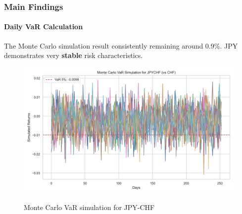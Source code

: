 \documentclass[10pt]{beamer}
\begin{document}
\begin{frame}
\frametitle{Main Findings}
\framesubtitle{Daily VaR Calculation}
The Monte Carlo simulation result consistently remaining around 0.9\%. JPY demonstrates very \textbf{stable} risk characteristics. 
\begin{figure}
    \centering   \includegraphics[width=0.9\linewidth]{../../reports/figures/monte_carlo_var_simulation_JPYCHF_vs_CHF.png}  \label{fig:monte_carlo_var_simulation_JPYCHF_vs_CHF}
    \caption{Monte Carlo VaR simulation for JPY-CHF}
\end{figure}
\end{frame}
\end{document}
